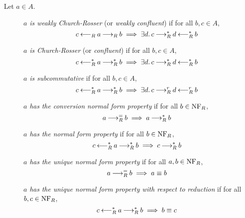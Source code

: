 \begin{definition} Let $a \in A$.
    \begin{description}
        \item[] \emph{$a$ is weakly Church-Rosser} (or \emph{weakly confluent}) if for all $b,c \in A$, \[c \mathbin{\longleftarrow_R} a \mathbin{\longrightarrow_R} b \implies \exists d.\, c \mathbin{\longrightarrow_R^*} d \mathbin{\longleftarrow_R^*} b\]
        \item[] \emph{$a$ is Church-Rosser} (or \emph{confluent}) if for all $b,c \in A$, \[c \mathbin{\longleftarrow_R^*} a \mathbin{\longrightarrow_R^*} b \implies \exists d.\, c \mathbin{\longrightarrow_R^*} d \mathbin{\longleftarrow_R^*} b\]
        \item[] \emph{$a$ is subcommutative} if for all $b, c \in A$,
        \[c \mathbin{\longleftarrow_R^*} a \mathbin{\longrightarrow_R^*} b \implies \exists d. \, c \mathbin{\longrightarrow_R^r} d \mathbin{\longleftarrow_R^r} b\]
        \item[] \emph{$a$ has the conversion normal form property} if for all $b \in \mathrm{NF}_R$, \[ a \mathbin{\longrightarrow_R^=} b \implies a\mathbin{\longrightarrow_R^*} b\]
        \item[] \emph{$a$ has the normal form property} if for all $b \in \mathrm{NF}_R$,
        \[c \mathbin{\longleftarrow_R^*} a \mathbin{\longrightarrow_R^*} b \implies c \mathbin{\longrightarrow_R^*} b\]
        \item[] \emph{$a$ has the unique normal form property} if for all $a, b \in \mathrm{NF}_R$, \[a \mathbin{\longrightarrow_R^=} b \implies a \equiv b\]
        \item[] \emph{$a$ has the unique normal form property with respect to reduction} if for all $b, c \in \mathrm{NF}_R$,
        \[c \mathbin{\longleftarrow_R^*} a \mathbin{\longrightarrow_R^*} b  \implies b \equiv c\]
    \end{description}
\end{definition}
